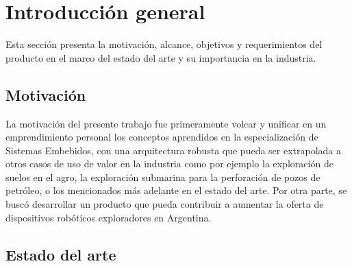 
\chapter{Introducción general} %

\label{Chapter1} %
\label{IntroGeneral}


\newcommand{\keyword}[1]{\textbf{#1}}
\newcommand{\tabhead}[1]{\textbf{#1}}
\newcommand{\code}[1]{\texttt{#1}}
\newcommand{\file}[1]{\texttt{\bfseries#1}}
\newcommand{\option}[1]{\texttt{\itshape#1}}
\newcommand{\grados}{$^{\circ}$}


Esta sección presenta la motivación, alcance, objetivos y requerimientos del producto en el marco del estado del arte y su importancia en la industria.  

\section{Motivación}

La motivación del presente trabajo fue primeramente volcar y unificar en un emprendimiento personal los conceptos aprendidos en la especialización de Sistemas Embebidos, con una arquitectura robusta que pueda ser extrapolada a otros casos de uso de valor en la industria como por ejemplo la exploración de suelos en el agro, la exploración submarina para la perforación de pozos de petróleo, o los mencionados más adelante en el estado del arte.
Por otra parte, se buscó desarrollar un producto que pueda contribuir a aumentar la oferta de dispositivos robóticos exploradores en Argentina.

\section{Estado del arte}

